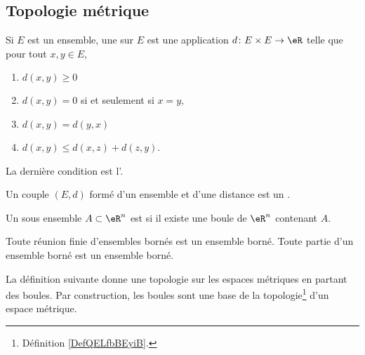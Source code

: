 \subsection{Topologie métrique}

\begin{definition}  \label{DefMVNVFsX}
    Si $E$ est un ensemble, une  sur $E$ est une application $d\colon E\times E\to \eR$ telle que pour tout $x,y\in E$,
    \begin{enumerate}

    \item
    $d(x,y)\geq 0$

    \item
    $d(x,y)=0$ si et seulement si $x=y$,

    \item
    $d(x,y)=d(y,x)$

    \item
    $d(x,y)\leq d(x,z)+d(z,y)$.

    \end{enumerate}
    La dernière condition est l'. 

    Un couple $(E,d)$ formé d'un ensemble et d'une distance est un .
\end{definition}


\begin{definition}
  Un sous ensemble $A \subset \eR^n$ est  si il existe une boule de $\eR^n$ contenant $A$.
\end{definition}

\begin{proposition}
  Toute réunion finie d'ensembles bornés est un ensemble borné. Toute partie d'un ensemble borné est un ensemble borné.
\end{proposition}

La définition suivante donne une topologie sur les espaces métriques en partant des boules. Par construction, les boules sont une base de la topologie\footnote{Définition \ref{DefQELfbBEyiB}.} d'un espace métrique.

